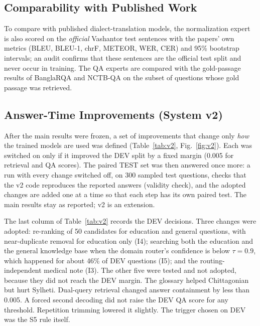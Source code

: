 \subsection{Comparability with Published Work}
To compare with published dialect-translation models, the normalization expert is also scored on the \emph{official} Vashantor test sentences \cite{faria2023vashantor} with the papers' own metrics (BLEU, BLEU-1, chrF, METEOR, WER, CER) and 95\% bootstrap intervals; an audit confirms that these sentences are the official test split and never occur in training. The QA experts are compared with the gold-passage results of BanglaRQA and NCTB-QA on the subset of questions whose gold passage was retrieved.

\subsection{Answer-Time Improvements (System v2)}
\label{sec:v2}
After the main results were frozen, a set of improvements that change only \emph{how} the trained models are used was defined (Table~\ref{tab:v2}, Fig.~\ref{fig:v2}). Each was switched on only if it improved the DEV split by a fixed margin (0.005 for retrieval and QA scores). The paired TEST set was then answered once more: a run with every change switched off, on 300 sampled test questions, checks that the v2 code reproduces the reported answers (validity check), and the adopted changes are added one at a time so that each step has its own paired test. The main results stay as reported; v2 is an extension.

The last column of Table~\ref{tab:v2} records the DEV decisions. Three changes were adopted: re-ranking of 50 candidates for education and general questions, with near-duplicate removal for education only (I4); searching both the education and the general knowledge base when the domain router's confidence is below $\tau=0.9$, which happened for about 46\% of DEV questions (I5); and the routing-independent medical note (I3). The other five were tested and not adopted, because they did not reach the DEV margin. The glossary helped Chittagonian but hurt Sylheti. Dual-query retrieval changed answer containment by less than 0.005. A forced second decoding did not raise the DEV QA score for any threshold. Repetition trimming lowered it slightly. The trigger chosen on DEV was the S5 rule itself.

